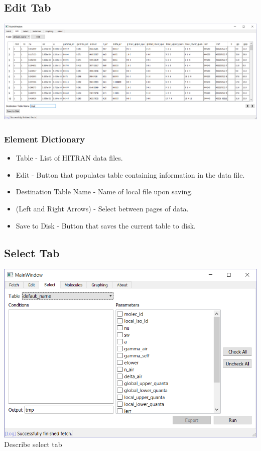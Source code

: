 \documentclass[12pt]{article}
\begin{document}
\subsection{Edit Tab}
\begin{center}
\includegraphics[scale = 0.4]{MainWindow_Edit}
\end{center}
\subsubsection{Element Dictionary}
\begin{itemize}
\item Table - List of HITRAN data files.
\item Edit - Button that populates table containing information in the data file.
\item Destination Table Name - Name of local file upon saving.
\item (Left and Right Arrows) - Select between pages of data.
\item Save to Disk - Button that saves the  current table to disk.
\end{itemize}

\subsection{Select Tab}
\includegraphics[scale = 0.8]{MainWindow_Select}
Describe select tab
\end{document}

